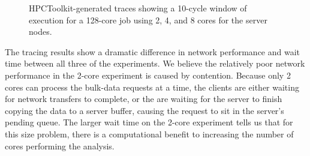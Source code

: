 \begin{figure}[htbp]
\begin{centering}
\vspace{-12pt}




\caption[Performance trace of 128-core run with different core
counts.]{HPCToolkit-generated traces showing a 10-cycle window of execution
for a 128-core job using 2, 4, and 8 cores for the server nodes.}
\label{fig:node-scaling-traces}
\end{centering}
\end{figure}

The tracing results show a dramatic difference in network performance and wait
time between all three of the experiments.  We believe the relatively poor
network performance in the 2-core experiment is caused by contention. Because
only 2 cores can process the bulk-data requests at a time, the clients are
either waiting for network transfers to complete, or the are waiting for the
server to finish copying the data to a server buffer, causing the request to
sit in the server's pending queue. The larger wait time on the 2-core experiment
tells us that for this size  problem, there is a computational benefit to
increasing the number of cores  performing the analysis.



